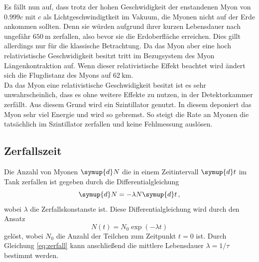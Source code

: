 Es fällt nun auf, dass trotz der hohen Geschwidigkeit der enstandenen Myon von $0.999c$ mit $c$ als Lichtgeschwindigtkeit im Vakuum, die Myonen nicht auf der Erde ankommen sollten.
Denn sie würden aufgrund ihrer kurzen Lebensdauer nach ungefähr $\SI{650}{\meter}$ zerfallen, also bevor sie die Erdoberfläche erreichen.
Dies gillt allerdings nur für die klassische Betrachtung.
Da das Myon aber eine hoch relativistische Geschwidigkeit besitzt tritt im Bezugsystem des Myon Längenkontraktion auf.
Wenn dieser relativistische Effekt beachtet wird ändert sich die Flugdistanz des Myons auf $\SI{62}{\kilo\meter}$. \\
Da das Myon eine relativistische Geschwidigkeit besitzt ist es sehr unwahrscheinlich, dass es ohne weitere Effekte zu nutzen, in der Detektorkammer zerfällt.
Aus diesem Grund wird ein Szintillator genutzt.
In diesem deponiert das Myon sehr viel Energie und wird so gebremst. 
So steigt die Rate an Myonen die tatsächlich im Szintillator zerfallen und keine Fehlmessung auslösen.
\subsection{Zerfallszeit}
Die Anzahl von Myonen $\symup{d}N$ die in einem Zeitintervall $\symup{d}t$ im Tank zerfallen ist gegeben durch die Differentialgleichung
\begin{equation*}
    \symup{d}N = -\lambda N \symup{d}t\, ,
\end{equation*}
wobei $\lambda$ die Zerfallskonstanste ist.
Diese Differentialgleichung wird durch den Ansatz 
\begin{equation}
    N(t) = N_0 \exp(-\lambda t)
    \label{eq:zerfall}
\end{equation}
gelöst, wobei $N_0$ die Anzahl der Teilchen zum Zeitpunkt $t=0$ ist.
Durch Gleichung \eqref{eq:zerfall} kann anschließend die mittlere Lebensdauer $\lambda = 1/\tau$ bestimmt werden.
